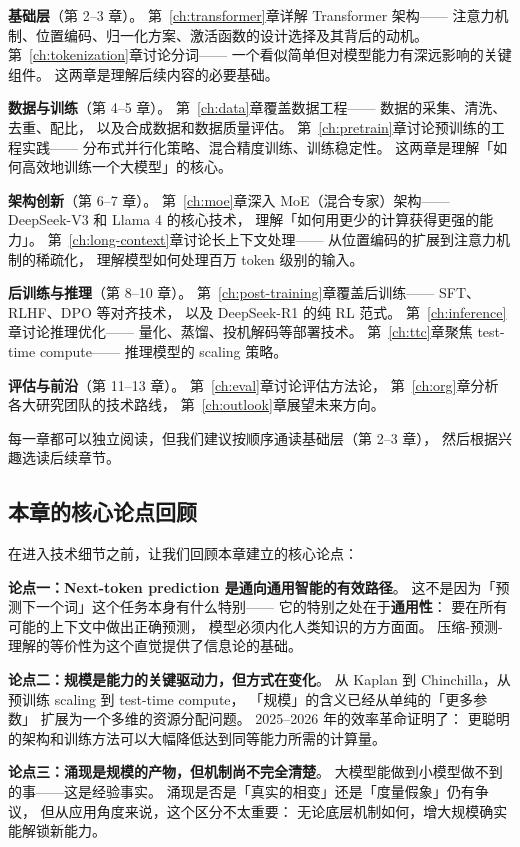 \textbf{基础层}（第 2--3 章）。
第~\ref{ch:transformer}章详解 Transformer 架构——
注意力机制、位置编码、归一化方案、激活函数的设计选择及其背后的动机。
第~\ref{ch:tokenization}章讨论分词——
一个看似简单但对模型能力有深远影响的关键组件。
这两章是理解后续内容的必要基础。

\textbf{数据与训练}（第 4--5 章）。
第~\ref{ch:data}章覆盖数据工程——
数据的采集、清洗、去重、配比，
以及合成数据和数据质量评估。
第~\ref{ch:pretrain}章讨论预训练的工程实践——
分布式并行化策略、混合精度训练、训练稳定性。
这两章是理解「如何高效地训练一个大模型」的核心。

\textbf{架构创新}（第 6--7 章）。
第~\ref{ch:moe}章深入 MoE（混合专家）架构——
DeepSeek-V3 和 Llama 4 的核心技术，
理解「如何用更少的计算获得更强的能力」。
第~\ref{ch:long-context}章讨论长上下文处理——
从位置编码的扩展到注意力机制的稀疏化，
理解模型如何处理百万 token 级别的输入。

\textbf{后训练与推理}（第 8--10 章）。
第~\ref{ch:post-training}章覆盖后训练——
SFT、RLHF、DPO 等对齐技术，
以及 DeepSeek-R1 的纯 RL 范式。
第~\ref{ch:inference}章讨论推理优化——
量化、蒸馏、投机解码等部署技术。
第~\ref{ch:ttc}章聚焦 test-time compute——
推理模型的 scaling 策略。

\textbf{评估与前沿}（第 11--13 章）。
第~\ref{ch:eval}章讨论评估方法论，
第~\ref{ch:org}章分析各大研究团队的技术路线，
第~\ref{ch:outlook}章展望未来方向。

每一章都可以独立阅读，但我们建议按顺序通读基础层（第 2--3 章），
然后根据兴趣选读后续章节。

\subsection{本章的核心论点回顾}

在进入技术细节之前，让我们回顾本章建立的核心论点：

\textbf{论点一：Next-token prediction 是通向通用智能的有效路径}。
这不是因为「预测下一个词」这个任务本身有什么特别——
它的特别之处在于\textbf{通用性}：
要在所有可能的上下文中做出正确预测，
模型必须内化人类知识的方方面面。
压缩-预测-理解的等价性为这个直觉提供了信息论的基础。

\textbf{论点二：规模是能力的关键驱动力，但方式在变化}。
从 Kaplan 到 Chinchilla，从预训练 scaling 到 test-time compute，
「规模」的含义已经从单纯的「更多参数」
扩展为一个多维的资源分配问题。
2025--2026 年的效率革命证明了：
更聪明的架构和训练方法可以大幅降低达到同等能力所需的计算量。

\textbf{论点三：涌现是规模的产物，但机制尚不完全清楚}。
大模型能做到小模型做不到的事——这是经验事实。
涌现是否是「真实的相变」还是「度量假象」仍有争议，
但从应用角度来说，这个区分不太重要：
无论底层机制如何，增大规模确实能解锁新能力。

